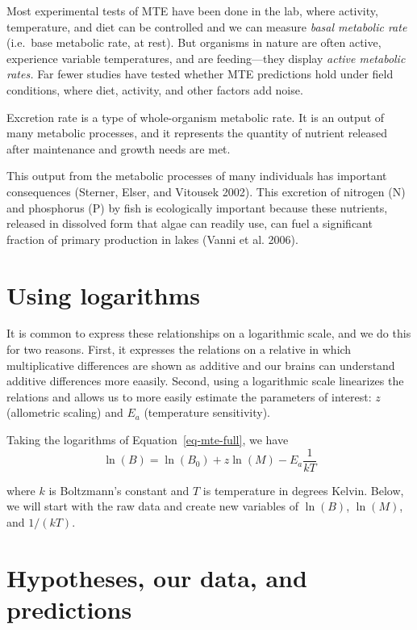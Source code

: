 \documentclass[
  letterpaper,
  DIV=11,
  numbers=noendperiod]{scrreprt}
\begin{document}
Most experimental tests of MTE have been done in the lab, where
activity, temperature, and diet can be controlled and we can measure
\emph{basal metabolic rate} (i.e.~base metabolic rate, at rest). But
organisms in nature are often active, experience variable temperatures,
and are feeding---they display \emph{active metabolic rates.} Far fewer
studies have tested whether MTE predictions hold under field conditions,
where diet, activity, and other factors add noise.

Excretion rate is a type of whole-organism metabolic rate. It is an
output of many metabolic processes, and it represents the quantity of
nutrient released after maintenance and growth needs are met.

This output from the metabolic processes of many individuals has
important consequences (Sterner, Elser, and Vitousek 2002). This
excretion of nitrogen (N) and phosphorus (P) by fish is ecologically
important because these nutrients, released in dissolved form that algae
can readily use, can fuel a significant fraction of primary production
in lakes (Vanni et al. 2006).

\section{Using logarithms}\label{using-logarithms}

It is common to express these relationships on a logarithmic scale, and
we do this for two reasons. First, it expresses the relations on a
relative in which multiplicative differences are shown as additive and
our brains can understand additive differences more eaasily. Second,
using a logarithmic scale linearizes the relations and allows us to more
easily estimate the parameters of interest: \(z\) (allometric scaling)
and \(E_a\) (temperature sensitivity).

Taking the logarithms of Equation~\ref{eq-mte-full}, we have
\[\ln (B) = \ln (B_0) + z \ln (M) - E_a \frac{1}{kT}\]

where \(k\) is Boltzmann's constant and \(T\) is temperature in degrees
Kelvin. Below, we will start with the raw data and create new variables
of \(\ln (B)\), \(\ln (M)\), and \(1/(kT)\).

\section{Hypotheses, our data, and
predictions}\label{hypotheses-our-data-and-predictions}
\end{document}
